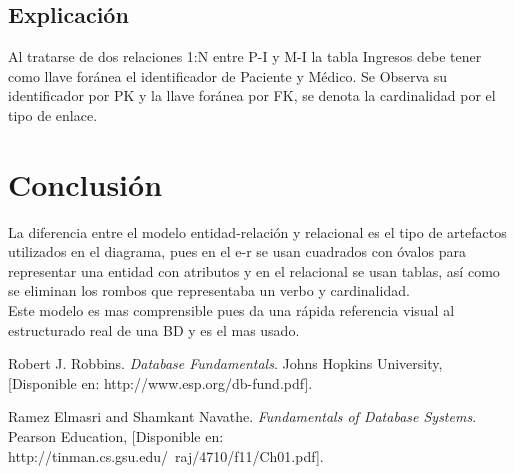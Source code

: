\documentclass[spanish,12pt,letterpapper]{article}
\begin{document}
    \subsection{Explicación}
    Al tratarse de dos relaciones 1:N entre P-I y M-I la tabla Ingresos debe tener como llave foránea el identificador de Paciente y Médico. Se Observa su identificador por PK y la llave foránea por FK, se denota la cardinalidad por el tipo de enlace.
    
    \section{Conclusión}
    La diferencia entre el modelo entidad-relación y relacional es el tipo de artefactos utilizados en el diagrama, pues en el e-r se usan cuadrados con óvalos para representar una entidad con atributos y en el relacional se usan tablas, así como se eliminan los rombos que representaba un verbo y cardinalidad.\\
    
    Este modelo es mas comprensible pues da una rápida referencia visual al estructurado real de una BD y es el mas usado.
	
	\pagebreak
	\begin{thebibliography}{9}	
	
		 Robert J. Robbins. 
		\emph{Database Fundamentals}. Johns Hopkins University, [Disponible en: http://www.esp.org/db-fund.pdf].
		
		 Ramez Elmasri and Shamkant Navathe. 
		\emph{Fundamentals of Database Systems}. Pearson Education, [Disponible en: http://tinman.cs.gsu.edu/~raj/4710/f11/Ch01.pdf].

	\end{thebibliography}
\end{document}
